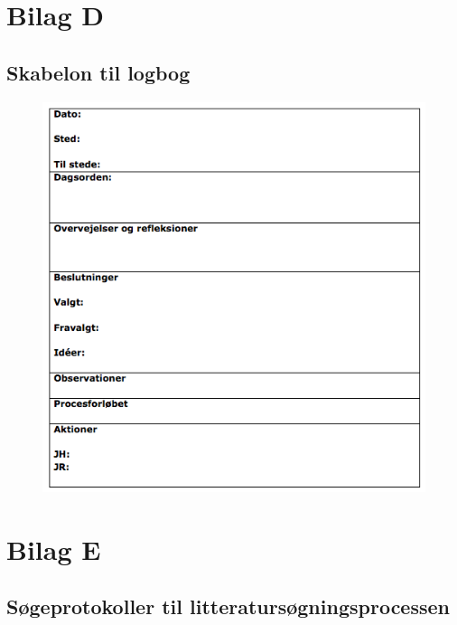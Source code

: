 \newpage

\section{Bilag D}
\subsection{Skabelon til logbog}
\label{App:logbog}
\begin{figure}[htb]
\centering
\includegraphics[width=6in]{Logbogskabelon}
\end{figure}

\newpage

\section{Bilag E}
\subsection{Søgeprotokoller til litteratursøgningsprocessen}
\label{App:sogeprotokol}

